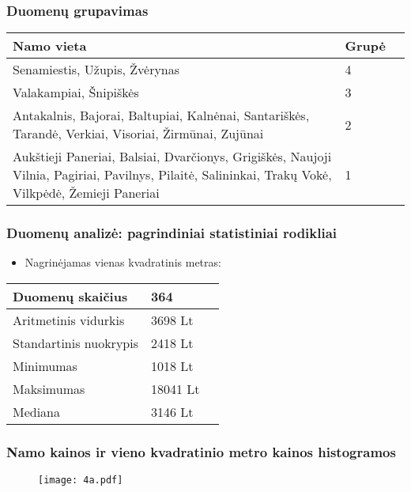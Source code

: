 \documentclass[utf8,hyperref={unicode}]{beamer}
\theoremstyle{change}\newtheorem{teorema}{Teiginys}
\theoremstyle{change}\newtheorem{salyga}{}
\begin{document}
\begin{frame}\large
    \frametitle{Duomenų grupavimas } 
     \begin{table}[H]
        \begin{center}
        \begin{tabular}{ | p{8cm} | l | l |}
       \hline
         \textbf{Namo vieta} & \textbf{Grupė} \\ \hline
    Senamiestis, Užupis, Žvėrynas & 4 \\ \hline
    Valakampiai, Šnipiškės & 3 \\ \hline
    Antakalnis, Bajorai, Baltupiai, Kalnėnai, Santariškės, Tarandė, Verkiai, Visoriai, Žirmūnai, Zujūnai & 2 \\ \hline
    Aukštieji Paneriai, Balsiai, Dvarčionys, Grigiškės, Naujoji Vilnia, Pagiriai, Pavilnys, Pilaitė, Salininkai, Trakų Vokė, Vilkpėdė, Žemieji Paneriai & 1 \\ \hline
    \end{tabular}
\end{center}
\end{table}
\end{frame}

\begin{frame} 
    \frametitle{Duomenų analizė: pagrindiniai statistiniai rodikliai} 
           \begin{itemize}
	\Large \item Nagrinėjamas vienas kvadratinis metras:
             \end{itemize}
\begin{table}[H]
\begin{center}
 \begin{tabular}{| l | l | l |}
    \hline
    Duomenų skaičius & 364 \\ \hline
    Aritmetinis vidurkis & 3698 Lt \\ \hline
    Standartinis nuokrypis & 2418 Lt \\ \hline
    Minimumas & 1018 Lt\\ \hline
    Maksimumas & 18041 Lt\\ \hline
    Mediana&3146 Lt  \\ 
    \hline
        \end{tabular}
        \end{center}
        \end{table}
\end{frame}

\begin{frame}
    \frametitle{Namo kainos ir vieno kvadratinio metro kainos histogramos} 
    \begin{figure}[H]
  \centering
    \texttt{[image: 4a.pdf]}
\end{figure}
\end{frame}
\end{document}
